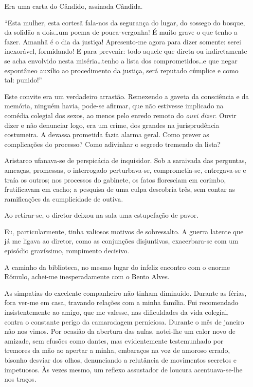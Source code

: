 Era uma carta do Cândido, assinada Cândida. 

``Esta mulher, esta cortesã fala{}-nos da segurança do lugar,
do sossego do bosque, da solidão a dois\ldots um poema de
pouca{}-vergonha! É muito grave o que tenho a fazer. Amanhã é o dia da
justiça! Apresento{}-me agora para dizer somente: serei inexorável,
formidando! E para prevenir: todo aquele que direta ou indiretamente se
acha envolvido nesta miséria\ldots tenho a lista dos comprometidos\ldots e
que negar espontâneo auxílio ao procedimento da justiça, será reputado
cúmplice e como tal: punido!'' 

Este convite era um verdadeiro arrastão.
Remexendo a gaveta da consciência e da memória, ninguém havia,
pode{}-se afirmar, que não estivesse implicado na comédia colegial dos
sexos, ao menos pelo enredo remoto do \textit{ouvi dizer}. Ouvir dizer e não
denunciar logo, era um crime, dos grandes na jurisprudência costumeira.
A devassa prometida fazia alarma geral. Como prever as complicações do
processo? Como adivinhar o segredo tremendo da lista? 

Aristarco ufanava{}-se de perspicácia de inquisidor. Sob a saraivada das
perguntas, ameaças, promessas, o interrogado perturbava{}-se,
comprometia{}-se, entregava{}-se e traía os outros; nos processos do
gabinete, os fatos floresciam em corimbo, frutificavam em cacho; a
pesquisa de uma culpa descobria três, sem contar as ramificações da
cumplicidade de outiva. 

Ao retirar{}-se, o diretor deixou na sala uma
estupefação de pavor. 

Eu, particularmente, tinha valiosos motivos de
sobressalto. A guerra latente que já me ligava ao diretor, como as
conjunções disjuntivas, exacerbara{}-se com um episódio gravíssimo,
rompimento decisivo. 

A caminho da biblioteca, no mesmo lugar do infeliz
encontro com o enorme Rômulo, achei{}-me inesperadamente com o Bento
Alves. 

As simpatias do excelente companheiro não tinham diminuído.
Durante as férias, fora ver{}-me em casa, travando relações com a minha
família. Fui recomendado insistentemente ao amigo, que me valesse, nas
dificuldades da vida colegial, contra o constante perigo da camaradagem
perniciosa. Durante o mês de janeiro não nos vimos. Por ocasião da
abertura das aulas, notei{}-lhe um calor novo de amizade, sem efusões
como dantes, mas evidentemente testemunhado por tremores da mão ao
apertar a minha, embaraços na voz de amoroso errado, bisonho desviar
dos olhos, denunciando a relutância de movimentos secretos e
impetuosos. Às vezes mesmo, um reflexo assustador de loucura
acentuava{}-se{}-lhe nos traços. 

